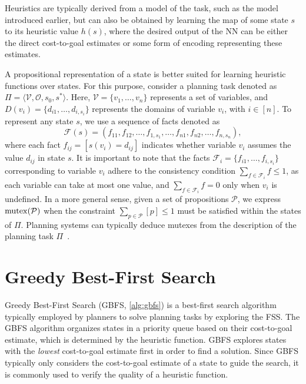 \documentclass[ppgc,diss,english]{iiufrgs}
\begin{document}
Heuristics are typically derived from a model of the task, such as the \sas model introduced earlier, but can also be obtained by learning the map of some state $s$ to its heuristic value $h(s)$, where the desired output of the NN can be either the direct cost-to-goal estimates or some form of encoding representing these estimates.

A propositional representation of a state is better suited for learning heuristic functions over states. For this purpose, consider a planning task denoted as $\Pi=\langle\mathcal{V},\mathcal{O},s_0,s^*\rangle$. Here, $\mathcal{V}=\{v_1,\ldots,v_n\}$ represents a set of variables, and $D(v_i)=\{d_{i1},\ldots,d_{i,s_i}\}$ represents the domains of variable $v_i$, with $i\in[n]$. To represent any state $s$, we use a sequence of facts denoted as
$$\mathcal{F}(s)=(f_{11},f_{12},\ldots,f_{1,s_1},\ldots,f_{n1},f_{n2},\ldots,f_{n,s_n}),$$ where each fact $f_{ij}=[s(v_i)=d_{ij}]$ indicates whether variable $v_i$ assumes the value $d_{ij}$ in state $s$. It is important to note that the facts $\mathcal{F}_i=\{f_{i1},\ldots,f_{i,s_i}\}$ corresponding to variable $v_i$ adhere to the consistency condition $\sum_{f\in \mathcal{F}_i} f\leq 1$, as each variable can take at most one value, and $\sum_{f\in \mathcal{F}_i} f=0$ only when $v_i$ is undefined. In a more general sense, given a set of propositions $\mathcal{P}$, we express $\operatorname{mutex}(\mathcal{P})$ when the constraint $\sum_{p\in \mathcal{P}} [p]\leq 1$ must be satisfied within the states of $\Pi$. Planning systems can typically deduce mutexes from the description of the planning task $\Pi$~\cite{Helmert/2009}.

\section{Greedy Best-First Search}
\label{sec:background-gbfs}
Greedy Best-First Search (GBFS, \cref{alg:gbfs}) is a best-first search algorithm typically employed by planners to solve planning tasks by exploring the FSS. The GBFS algorithm organizes states in a priority queue based on their cost-to-goal estimate, which is determined by the heuristic function. GBFS explores states with the \emph{lowest} cost-to-goal estimate first in order to find a solution. Since GBFS typically only considers the cost-to-goal estimate of a state to guide the search, it is commonly used to verify the quality of a heuristic function.
\end{document}
